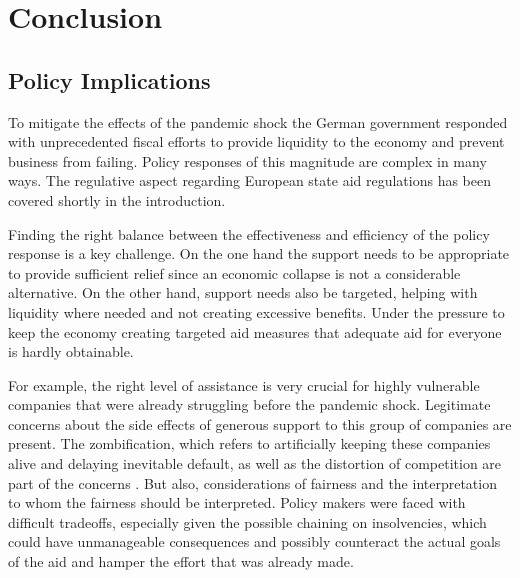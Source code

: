 
\chapter{Conclusion} %

\label{Chapter6} %


\section{Policy Implications}

To mitigate the effects of the pandemic shock the German government responded with unprecedented fiscal efforts to provide liquidity to the economy and prevent business from failing. Policy responses of this magnitude are complex in many ways. The regulative aspect regarding European state aid regulations has been covered shortly in the introduction.

Finding the right balance between the effectiveness and efficiency of the policy response is a key challenge. On the one hand the support needs to be appropriate to provide sufficient relief since an economic collapse is not a considerable alternative. On the other hand, support needs also be targeted, helping with liquidity where needed and not creating excessive benefits. 
Under the pressure to keep the economy creating targeted aid measures that adequate aid for everyone is hardly obtainable.

For example, the right level of assistance is very crucial for highly vulnerable companies that were already struggling before the pandemic shock. Legitimate concerns about the side effects of generous support to this group of companies are present. The zombification, which refers to artificially keeping these companies alive and delaying inevitable default, as well as the distortion of competition are part of the concerns \parencite{dorr_small_2022}. But also, considerations of fairness and the interpretation to whom the fairness should be interpreted. Policy makers were faced with difficult tradeoffs, especially given the possible chaining on insolvencies, which could have unmanageable consequences and possibly counteract the actual goals of the aid and hamper the effort that was already made.

